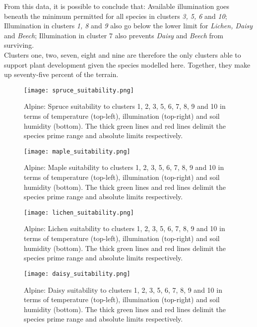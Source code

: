From this data, it is possible to conclude that: Available illumination goes beneath the minimum permitted for all species in clusters \textit{3, 5, 6} and \textit{10}; Illumination in clusters \textit{1, 8} and \textit{9} also go below the lower limit for \textit{Lichen, Daisy} and \textit{Beech}; Illumination in cluster 7 also prevents \textit{Daisy} and \textit{Beech} from surviving. \\

Clusters one, two, seven, eight and nine are therefore the only clusters able to support plant development given the species modelled here. Together, they make up seventy-five percent of the terrain.\\

\begin{figure}
\center
	\texttt{[image: spruce\_suitability.png]}
	\caption{ Alpine: Spruce suitability to clusters 1, 2, 3, 5, 6, 7, 8, 9 and 10 in terms of temperature (top-left), illumination (top-right) and soil humidity (bottom). The thick green lines and red lines delimit the species prime range and absolute limits respectively.}
	\label{fig:results_alpine_spruce_suitability}
\end{figure}

\begin{figure}
\center
	\texttt{[image: maple\_suitability.png]}
	\caption{ Alpine: Maple suitability to clusters 1, 2, 3, 5, 6, 7, 8, 9 and 10 in terms of temperature (top-left), illumination (top-right) and soil humidity (bottom). The thick green lines and red lines delimit the species prime range and absolute limits respectively.}
	\label{fig:results_alpine_maple_suitability}
\end{figure}

\begin{figure}
\center
	\texttt{[image: lichen\_suitability.png]}
	\caption{ Alpine: Lichen suitability to clusters 1, 2, 3, 5, 6, 7, 8, 9 and 10 in terms of temperature (top-left), illumination (top-right) and soil humidity (bottom). The thick green lines and red lines delimit the species prime range and absolute limits respectively.}
	\label{fig:results_alpine_lichen_suitability}
\end{figure}

\begin{figure}
\center
	\texttt{[image: daisy\_suitability.png]}
	\caption{ Alpine: Daisy suitability to clusters 1, 2, 3, 5, 6, 7, 8, 9 and 10 in terms of temperature (top-left), illumination (top-right) and soil humidity (bottom). The thick green lines and red lines delimit the species prime range and absolute limits respectively.}
	\label{fig:results_alpine_daisy_suitability}
\end{figure}

